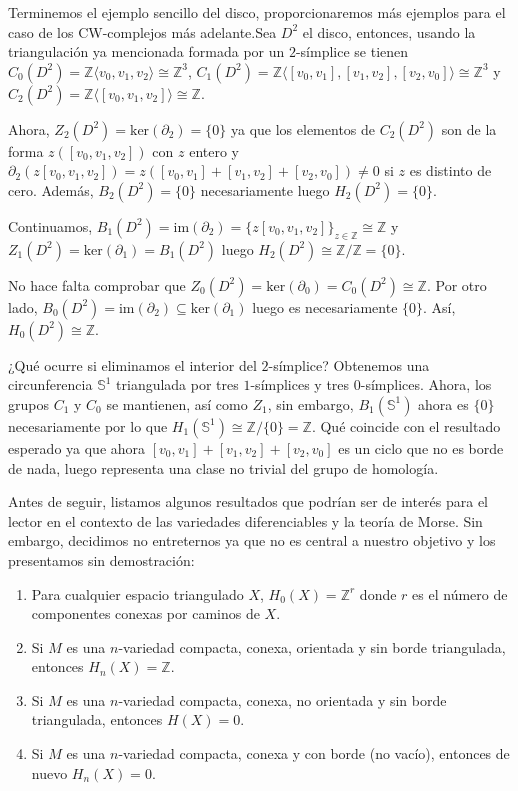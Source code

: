 \bigskip

Terminemos el ejemplo sencillo del disco, proporcionaremos más ejemplos para el caso de los CW-complejos más adelante.Sea $D^2$ el disco, entonces, usando la triangulación ya mencionada formada por un $2$-símplice se tienen $C_0(D^2) = \mathbb{Z}\langle v_0, v_1, v_2 \rangle \cong \mathbb{Z}^3$, $C_1(D^2)=\mathbb{Z}\langle [v_0,v_1],[v_1,v_2],[v_2,v_0] \rangle \cong \mathbb{Z}^3$ y $C_2(D^2)=\mathbb{Z}\langle [v_0,v_1,v_2] \rangle \cong \mathbb{Z}$. 
    
Ahora, $Z_2(D^2)= \text{ker}(\partial_2)=\{0\}$ ya que los elementos de $C_2(D^2)$ son de la forma $z([v_0,v_1,v_2])$ con $z$ entero y $\partial_2(z[v_0,v_1,v_2]) = z([v_0,v_1]+[v_1,v_2]+[v_2,v_0]) \neq 0$ si $z$ es distinto de cero. Además, $B_2(D^2) =\{0\}$ necesariamente luego $H_2(D^2)=\{0\}$.
    
Continuamos, $B_1(D^2)=\text{im}(\partial_2)=\{z[v_0,v_1,v_2]\}_{z\in\mathbb{Z}}\cong \mathbb{Z}$ y $Z_1(D^2)= \text{ker}(\partial_1)=B_1(D^2)$ luego $H_2(D^2)\cong \mathbb{Z}/\mathbb{Z} = \{0\}$.

No hace falta comprobar que $Z_0(D^2)=\text{ker}(\partial_0)=C_0(D^2)\cong \mathbb{Z}$. Por otro lado, $B_0(D^2)=\text{im}(\partial_2)\subseteq \text{ker}(\partial_1)$ luego es necesariamente $\{0\}$. Así, $H_0(D^2)\cong \mathbb{Z}$.

¿Qué ocurre si eliminamos el interior del $2$-símplice? Obtenemos una circunferencia $\mathbb{S}^1$ triangulada por tres $1$-símplices y tres $0$-símplices. Ahora, los grupos $C_1$ y $C_0$ se mantienen, así como $Z_1$, sin embargo, $B_1(\mathbb{S}^1)$ ahora es $\{0\}$ necesariamente por lo que $H_1(\mathbb{S}^1)\cong\mathbb{Z}/\{0\} = \mathbb{Z}$. Qué coincide con el resultado esperado ya que ahora $[v_0,v_1]+[v_1,v_2]+[v_2,v_0]$ es un ciclo que no es borde de nada, luego representa una clase no trivial del grupo de homología.

\bigskip

Antes de seguir, listamos algunos resultados que podrían ser de interés para el lector en el contexto de las variedades diferenciables y la teoría de Morse. Sin embargo, decidimos no entreternos ya que no es central a nuestro objetivo y los presentamos sin demostración:

\begin{enumerate}
    \item Para cualquier espacio triangulado $X$, $H_0(X)=\mathbb{Z}^r$ donde $r$ es el número de componentes conexas por caminos de $X$.
    \item Si $M$ es una $n$-variedad compacta, conexa, orientada y sin borde triangulada, entonces $H_n(X)=\mathbb{Z}$.
    \item Si $M$ es una $n$-variedad compacta, conexa, no orientada y sin borde triangulada, entonces $H(X)=0$.
    \item Si $M$ es una $n$-variedad compacta, conexa y con borde (no vacío), entonces de nuevo $H_n(X)=0$.
\end{enumerate}


